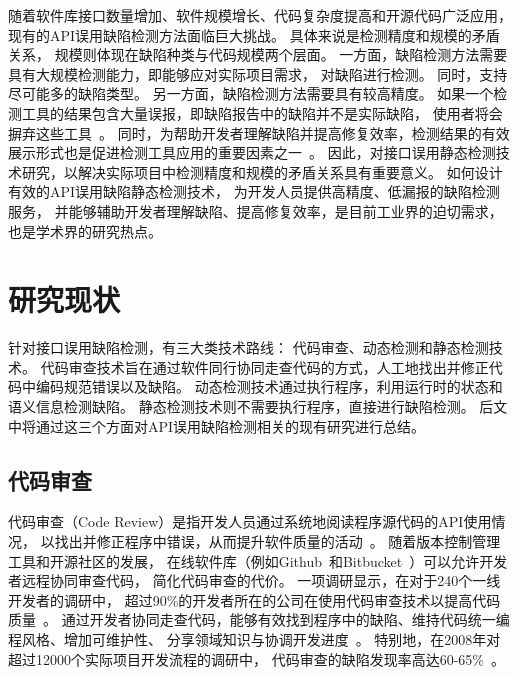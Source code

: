 随着软件库接口数量增加、软件规模增长、代码复杂度提高和开源代码广泛应用，
现有的API误用缺陷检测方法面临巨大挑战。
具体来说是检测精度和规模的矛盾关系，
规模则体现在缺陷种类与代码规模两个层面。
一方面，缺陷检测方法需要具有大规模检测能力，即能够应对实际项目需求，
对缺陷进行检测。
同时，支持尽可能多的缺陷类型。
另一方面，缺陷检测方法需要具有较高精度。
如果一个检测工具的结果包含大量误报，即缺陷报告中的缺陷并不是实际缺陷，
使用者将会摒弃这些工具~\cite{10-acm-precision}。
同时，为帮助开发者理解缺陷并提高修复效率，检测结果的有效展示形式也是促进检测工具应用的重要因素之一~\cite{13-icse-donotuse}。
因此，对接口误用静态检测技术研究，以解决实际项目中检测精度和规模的矛盾关系具有重要意义。
如何设计有效的API误用缺陷静态检测技术，
为开发人员提供高精度、低漏报的缺陷检测服务，
并能够辅助开发者理解缺陷、提高修复效率，是目前工业界的迫切需求，
也是学术界的研究热点。






\section{研究现状}
针对接口误用缺陷检测，有三大类技术路线：
代码审查、动态检测和静态检测技术。
代码审查技术旨在通过软件同行协同走查代码的方式，人工地找出并修正代码中编码规范错误以及缺陷。
动态检测技术通过执行程序，利用运行时的状态和语义信息检测缺陷。
静态检测技术则不需要执行程序，直接进行缺陷检测。
后文中将通过这三个方面对API误用缺陷检测相关的现有研究进行总结。

\subsection{代码审查}
代码审查（Code Review）是指开发人员通过系统地阅读程序源代码的API使用情况，
以找出并修正程序中错误，从而提升软件质量的活动~\cite{code-review}。
随着版本控制管理工具和开源社区的发展，
在线软件库（例如Github~\cite{github}和Bitbucket~\cite{bitbucket}）可以允许开发者远程协同审查代码，
简化代码审查的代价。
一项调研显示，在对于240个一线开发者的调研中，
超过90\%的开发者所在的公司在使用代码审查技术以提高代码质量~\cite{17-profes-code-review}。
通过开发者协同走查代码，能够有效找到程序中的缺陷、维持代码统一编程风格、增加可维护性、
分享领域知识与协调开发进度~\cite{13-icse-code-review}。
特别地，在2008年对超过12000个实际项目开发流程的调研中，
代码审查的缺陷发现率高达60-65\%~\cite{08-code-review}。

